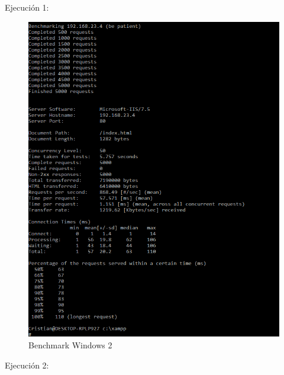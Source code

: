 \begin{enumerate}
		Ejecución 1:
		
		\begin{figure}[H] %
			\centering
			\includegraphics[scale=0.4]{pics/xamppWin2}  %
			\caption{Benchmark Windows 2} \label{fig:win2}
		\end{figure}
		
		Ejecución 2:
		

\end{enumerate}
